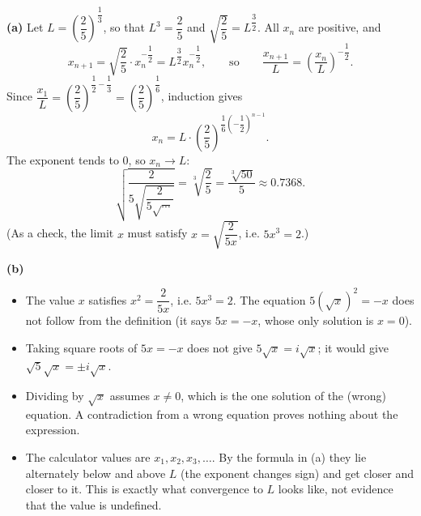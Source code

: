\textbf{(a)} Let $L=\left(\dfrac25\right)^{\dfrac13}$, so that $L^3=\dfrac25$ and $\sqrt{\dfrac25}=L^{\dfrac32}$. All $x_n$ are positive, and
\[x_{n+1}=\sqrt{\dfrac25}\cdot x_n^{-\dfrac12}=L^{\dfrac32}x_n^{-\dfrac12},\qquad\text{so}\qquad\dfrac{x_{n+1}}{L}=\left(\dfrac{x_n}{L}\right)^{-\dfrac12}.\]
Since $\dfrac{x_1}{L}=\left(\dfrac25\right)^{\dfrac12-\dfrac13}=\left(\dfrac25\right)^{\dfrac16}$, induction gives
\[x_n=L\cdot\left(\dfrac25\right)^{\dfrac16\left(-\dfrac12\right)^{n-1}}.\]
The exponent tends to $0$, so $x_n\to L$:
\[\sqrt{\dfrac{2}{5\sqrt{\dfrac{2}{5\sqrt{\cdots}}}}}=\boxed{\sqrt[3]{\dfrac25}=\dfrac{\sqrt[3]{50}}{5}}\approx0.7368.\]
(As a check, the limit $x$ must satisfy $x=\sqrt{\dfrac{2}{5x}}$, i.e. $5x^3=2$.)

\textbf{(b)}
\begin{itemize}
\item The value $x$ satisfies $x^2=\dfrac{2}{5x}$, i.e. $5x^3=2$. The equation $5\left(\sqrt x\right)^2=-x$ does not follow from the definition (it says $5x=-x$, whose only solution is $x=0$).
\item Taking square roots of $5x=-x$ does not give $5\sqrt x=i\sqrt x$; it would give $\sqrt5\sqrt x=\pm i\sqrt x$.
\item Dividing by $\sqrt x$ assumes $x\ne0$, which is the one solution of the (wrong) equation. A contradiction from a wrong equation proves nothing about the expression.
\item The calculator values are $x_1,x_2,x_3,\dots$. By the formula in (a) they lie alternately below and above $L$ (the exponent changes sign) and get closer and closer to it. This is exactly what convergence to $L$ looks like, not evidence that the value is undefined.
\end{itemize}
